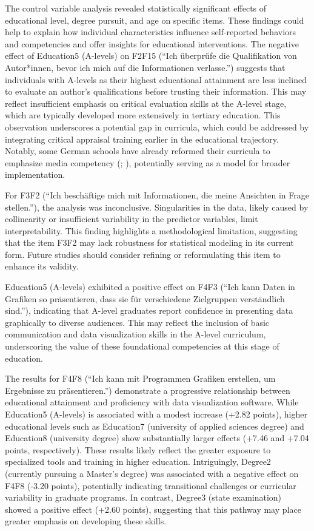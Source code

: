 \documentclass[
  12pt,
  a4paper,
  twoside]{article}
\begin{document}
The control variable analysis revealed statistically significant effects of educational level, degree pursuit, and age on specific items. These findings could help to explain how individual characteristics influence self-reported behaviors and competencies and offer insights for educational interventions.
The negative effect of Education5 (A-levels) on F2F15 (``Ich überprüfe die Qualifikation von Autor*innen, bevor ich mich auf die Informationen verlasse.'') suggests that individuals with A-levels as their highest educational attainment are less inclined to evaluate an author's qualifications before trusting their information. This may reflect insufficient emphasis on critical evaluation skills at the A-level stage, which are typically developed more extensively in tertiary education. This observation underscores a potential gap in curricula, which could be addressed by integrating critical appraisal training earlier in the educational trajectory. Notably, some German schools have already reformed their curricula to emphasize media competency (; ), potentially serving as a model for broader implementation.

For F3F2 (``Ich beschäftige mich mit Informationen, die meine Ansichten in Frage stellen.''), the analysis was inconclusive. Singularities in the data, likely caused by collinearity or insufficient variability in the predictor variables, limit interpretability. This finding highlights a methodological limitation, suggesting that the item F3F2 may lack robustness for statistical modeling in its current form. Future studies should consider refining or reformulating this item to enhance its validity.

Education5 (A-levels) exhibited a positive effect on F4F3 (``Ich kann Daten in Grafiken so präsentieren, dass sie für verschiedene Zielgruppen verständlich sind.''), indicating that A-level graduates report confidence in presenting data graphically to diverse audiences. This may reflect the inclusion of basic communication and data visualization skills in the A-level curriculum, underscoring the value of these foundational competencies at this stage of education.

The results for F4F8 (``Ich kann mit Programmen Grafiken erstellen, um Ergebnisse zu präsentieren.'') demonstrate a progressive relationship between educational attainment and proficiency with data visualization software. While Education5 (A-levels) is associated with a modest increase (+2.82 points), higher educational levels such as Education7 (university of applied sciences degree) and Education8 (university degree) show substantially larger effects (+7.46 and +7.04 points, respectively). These results likely reflect the greater exposure to specialized tools and training in higher education. Intriguingly, Degree2 (currently pursuing a Master's degree) was associated with a negative effect on F4F8 (-3.20 points), potentially indicating transitional challenges or curricular variability in graduate programs. In contrast, Degree3 (state examination) showed a positive effect (+2.60 points), suggesting that this pathway may place greater emphasis on developing these skills.
\end{document}
